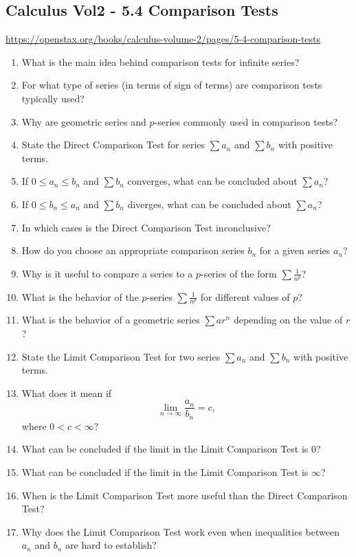\subsection{Calculus Vol2 - 5.4 Comparison Tests}

\url{https://openstax.org/books/calculus-volume-2/pages/5-4-comparison-tests}

\begin{enumerate}
  \item What is the main idea behind comparison tests for infinite series?
  \item For what type of series (in terms of sign of terms) are comparison tests typically used?
  \item Why are geometric series and $p$-series commonly used in comparison tests?
  \item State the Direct Comparison Test for series $\sum a_n$ and $\sum b_n$ with positive terms.
  \item If $0 \le a_n \le b_n$ and $\sum b_n$ converges, what can be concluded about $\sum a_n$?
  \item If $0 \le b_n \le a_n$ and $\sum b_n$ diverges, what can be concluded about $\sum a_n$?
  \item In which cases is the Direct Comparison Test inconclusive?
  \item How do you choose an appropriate comparison series $b_n$ for a given series $a_n$?
  \item Why is it useful to compare a series to a $p$-series of the form $\sum \frac{1}{n^p}$?
  \item What is the behavior of the $p$-series $\sum \frac{1}{n^p}$ for different values of $p$?
  \item What is the behavior of a geometric series $\sum ar^n$ depending on the value of $r$?
  \item State the Limit Comparison Test for two series $\sum a_n$ and $\sum b_n$ with positive terms.
  \item What does it mean if
    \[
      \lim_{n \to \infty} \frac{a_n}{b_n} = c,
    \]
    where $0 < c < \infty$?
  \item What can be concluded if the limit in the Limit Comparison Test is $0$?
  \item What can be concluded if the limit in the Limit Comparison Test is $\infty$?
  \item When is the Limit Comparison Test more useful than the Direct Comparison Test?
  \item Why does the Limit Comparison Test work even when inequalities between $a_n$ and $b_n$ are hard to establish?

\end{enumerate}
